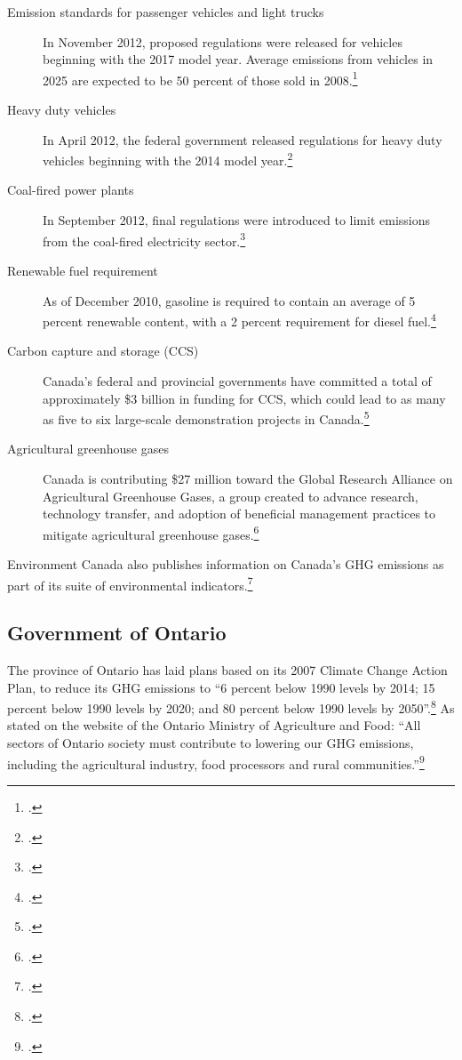 \begin{description}
	\item[Emission standards for passenger vehicles and light trucks] In November 2012, proposed regulations were released for vehicles beginning with the 2017 model year. 
	Average emissions from vehicles in 2025 are expected to be 50 percent of those sold in 2008.\footcite[][]{ECReducing}
	\item[Heavy duty vehicles] In April 2012, the federal government released regulations for heavy duty vehicles beginning with the 2014 model year.\footcite[][]{ECReducing}
	\item[Coal-fired power plants] In September 2012, final regulations were introduced to limit emissions from the coal-fired electricity sector.\footcite[][]{ECCoalFired}
	\item[Renewable fuel requirement] As of December 2010, gasoline is required to contain an average of 5 percent renewable content, with a 2 percent requirement for diesel fuel.\footcite[][]{ECReducing}
	\item[Carbon capture and storage (CCS)] Canada's federal and provincial governments have committed a total of approximately \$3 billion in funding for CCS, which could lead to as many as five to six large-scale demonstration projects in Canada.\footcite[][]{ECReducing}
	\item[Agricultural greenhouse gases] Canada is contributing \$27 million toward the Global Research Alliance on Agricultural Greenhouse Gases, a group created to advance research, technology transfer, and adoption of beneficial management practices to mitigate agricultural greenhouse gases.\footcite[][]{ECReducing}
\end{description}		
		


Environment Canada also publishes information on Canada's GHG emissions as part of its suite of environmental indicators.\footcite[][]{ECGHGIndicators}


		
		\subsection{Government of Ontario}



The province of Ontario has laid plans based on its 2007 Climate Change Action Plan, to reduce its GHG emissions to ``6 percent below 1990 levels by 2014; 15 percent below 1990 levels by 2020; and 80 percent below 1990 levels by 2050''.\footcite[][p.3]{20082009ActionPlan}
As stated on the website of the Ontario Ministry of Agriculture and Food: ``All sectors of Ontario society must contribute to lowering our GHG emissions, including the agricultural industry, food processors and rural communities.''\footcite[][]{OntarioCCandAg}



